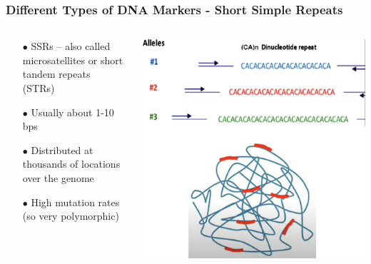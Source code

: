 \documentclass{beamer}
\begin{document}
\begin{frame}
	
	\frametitle{Different Types of DNA Markers - Short Simple Repeats}
	
\begin{columns}
	\begin{column}{0.5\textwidth}
		\begin{itemize}
			\item[$\bullet$] SSRs – also called microsatellites or short tandem repeats (STRs)
			\item[$\bullet$] Usually about 1-10 bps
			\item[$\bullet$] Distributed at thousands of locations over the genome
			\item[$\bullet$] High mutation rates (so very polymorphic)
		\end{itemize}
		\end{column}
		\begin{column}{0.5\textwidth}
			\includegraphics[keepaspectratio, width  = \textwidth]{img/microsat}
		\end{column}
	\end{columns}

\end{frame}
\end{document}
